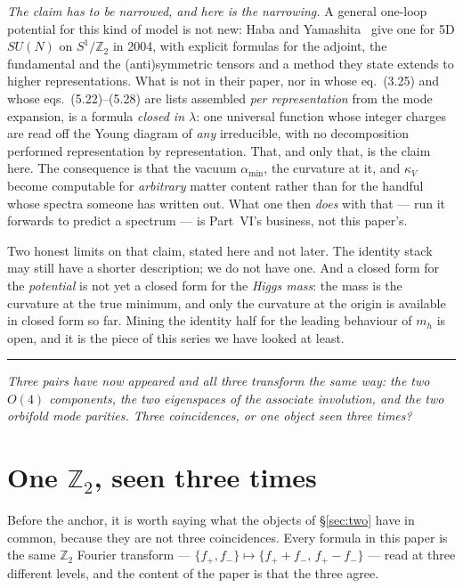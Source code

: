 \documentclass[11pt,a4paper]{article}
\newcommand{\ZZ}{\mathbb{Z}}
\newcommand{\su}[1]{SU(#1)}
\newcommand{\bridge}[1]{\par\medskip\noindent
  \textcolor{hdrblue!45}{\rule{2.2cm}{0.6pt}}\;\;\parbox[t]{0.84\textwidth}{\small\itshape
  \textcolor{hdrblue!85}{#1}}\par\medskip}
\begin{document}
\noindent \emph{The claim has to be narrowed, and here is the narrowing.} A general one-loop
potential for this kind of model is not new: Haba and Yamashita~\cite{HY} give one for 5D $\su N$ on
$S^1/\ZZ_2$ in 2004, with explicit formulas for the adjoint, the fundamental and the (anti)symmetric
tensors and a method they state extends to higher representations. What is not in their paper, nor
in \cite{AHMN} whose eq.~(3.25) and \cite{KKKY} whose eqs.~(5.22)--(5.28) are lists assembled
\emph{per representation} from the mode expansion, is a formula \emph{closed in $\lambda$}: one
universal function whose integer charges are read off the Young diagram of \emph{any} irreducible,
with no decomposition performed representation by representation. That, and only that, is the claim
here. The consequence is that the vacuum $\alpha_{\min}$,
the curvature at it, and $\kappa_V$ become computable for \emph{arbitrary} matter content rather than
for the handful whose spectra someone has written out. What one then \emph{does} with that --- run it
forwards to predict a spectrum --- is Part~VI's business, not this paper's.

Two honest limits on that claim, stated here and not later. The identity stack may still have a
shorter description; we do not have one. And a closed form for the \emph{potential} is not yet a
closed form for the \emph{Higgs mass}: the mass is the curvature at the true minimum, and only the
curvature at the origin is available in closed form so far. Mining the identity half for the leading
behaviour of $m_h$ is open, and it is the piece of this series we have looked at least.

\bridge{Three pairs have now appeared and all three transform the same way: the two $O(4)$
components, the two eigenspaces of the associate involution, and the two orbifold mode parities.
Three coincidences, or one object seen three times?}

\section{One $\ZZ_2$, seen three times}\label{sec:onez2}

Before the anchor, it is worth saying what the objects of \S\ref{sec:two} have in common, because
they are not three coincidences. Every formula in this paper is the same $\ZZ_2$ Fourier transform
--- $\{f_+,f_-\}\mapsto\{f_++f_-,\,f_+-f_-\}$ --- read at three different levels, and the content of
the paper is that the three agree.
\end{document}
